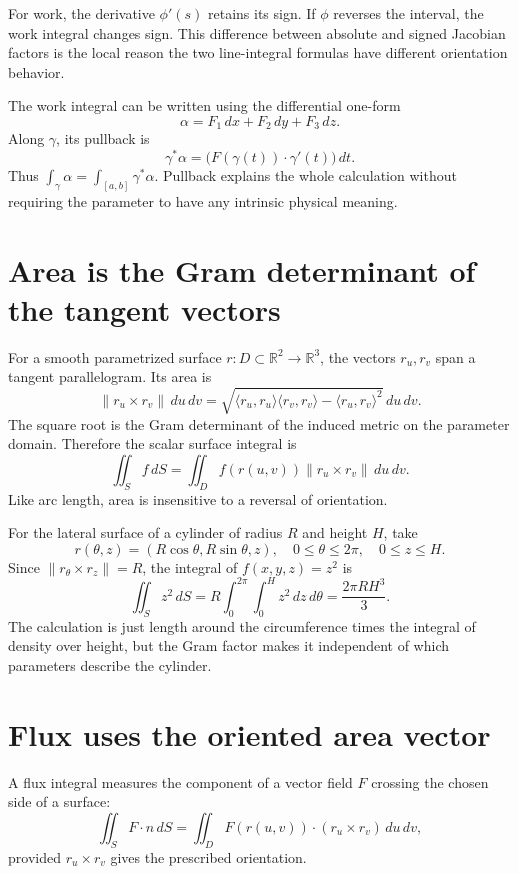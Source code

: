 For work, the derivative \(\phi'(s)\) retains its sign. If \(\phi\) reverses the interval, the work integral changes sign. This difference between absolute and signed Jacobian factors is the local reason the two line-integral formulas have different orientation behavior.

The work integral can be written using the differential one-form
\[
 \alpha=F_1\,dx+F_2\,dy+F_3\,dz.
\]
Along \(\gamma\), its pullback is
\[
 \gamma^*\alpha=
 \bigl(F(\gamma(t))\cdot\gamma'(t)\bigr)\,dt.
\]
Thus \(\int_\gamma\alpha=\int_{[a,b]}\gamma^*\alpha\). Pullback explains the whole calculation without requiring the parameter to have any intrinsic physical meaning.

\section{Area is the Gram determinant of the tangent vectors}

For a smooth parametrized surface \(r:D\subset\mathbb R^2\to\mathbb R^3\), the vectors \(r_u,r_v\) span a tangent parallelogram. Its area is
\[
 \|r_u\times r_v\|\,du\,dv
 =\sqrt{\langle r_u,r_u\rangle\langle r_v,r_v\rangle
        -\langle r_u,r_v\rangle^2}\,du\,dv.
\]
The square root is the Gram determinant of the induced metric on the parameter domain. Therefore the scalar surface integral is
\[
 \boxed{\iint_S f\,dS
       =\iint_D f(r(u,v))\|r_u\times r_v\|\,du\,dv.}
\]
Like arc length, area is insensitive to a reversal of orientation.

For the lateral surface of a cylinder of radius \(R\) and height \(H\), take
\[
 r(\theta,z)=(R\cos\theta,R\sin\theta,z),
 \quad 0\le\theta\le2\pi,\quad0\le z\le H.
\]
Since \(\|r_\theta\times r_z\|=R\), the integral of \(f(x,y,z)=z^2\) is
\[
 \iint_S z^2\,dS
 =R\int_0^{2\pi}\int_0^H z^2\,dz\,d\theta
 =\frac{2\pi RH^3}{3}.
\]
The calculation is just length around the circumference times the integral of density over height, but the Gram factor makes it independent of which parameters describe the cylinder.

\section{Flux uses the oriented area vector}

A flux integral measures the component of a vector field \(F\) crossing the chosen side of a surface:
\[
 \iint_S F\cdot n\,dS
 =\iint_D F(r(u,v))\cdot(r_u\times r_v)\,du\,dv,
\]
provided \(r_u\times r_v\) gives the prescribed orientation.

